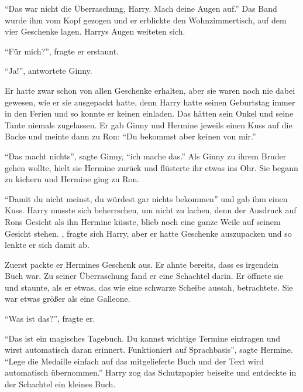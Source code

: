 \enquote{Das war nicht die Überraschung, Harry. Mach deine Augen auf.} Das Band wurde ihm vom Kopf gezogen und er erblickte den Wohnzimmertisch, auf dem vier Geschenke lagen. Harrys Augen weiteten sich.

\enquote{Für mich?}, fragte er erstaunt.

\enquote{Ja!}, antwortete Ginny.

Er hatte zwar schon von allen Geschenke erhalten, aber sie waren noch nie dabei gewesen, wie er sie ausgepackt hatte, denn Harry hatte seinen Geburtstag immer in den Ferien und so konnte er keinen einladen. Das hätten sein Onkel und seine Tante niemals zugelassen. Er gab Ginny und Hermine jeweils einen Kuss auf die Backe und meinte dann zu Ron: \enquote{Du bekommst aber keinen von mir.}

\enquote{Das macht nichts}, sagte Ginny, \enquote{ich mache das.} Als Ginny zu ihrem Bruder gehen wollte, hielt sie Hermine zurück und flüsterte ihr etwas ins Ohr. Sie begann zu kichern und Hermine ging zu Ron.

\enquote{Damit du nicht meinst, du würdest gar nichts bekommen} und gab ihm einen Kuss. Harry musste sich beherrschen, um nicht zu lachen, denn der Ausdruck auf Rons Gesicht als ihn Hermine küsste, blieb noch eine ganze Weile auf seinem Gesicht stehen. , fragte sich Harry, aber er hatte Geschenke auszupacken und so lenkte er sich damit ab.

Zuerst packte er Hermines Geschenk aus. Er ahnte bereits, dass es irgendein Buch war. Zu seiner Überraschung fand er eine Schachtel darin. Er öffnete sie und staunte, als er etwas, das wie eine schwarze Scheibe aussah, betrachtete. Sie war etwas größer als eine Galleone.

\enquote{Was ist das?}, fragte er.

\enquote{Das ist ein magisches Tagebuch. Du kannst wichtige Termine eintragen und wirst automatisch daran erinnert. Funktioniert auf Sprachbasis}, sagte Hermine. \enquote{Lege die Medaille einfach auf das mitgelieferte Buch und der Text wird automatisch übernommen.} Harry zog das Schutzpapier beiseite und entdeckte in der Schachtel ein kleines Buch.

